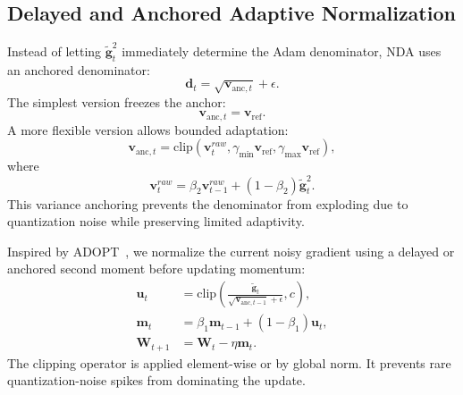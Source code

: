 \documentclass[journal]{IEEEtran}
\begin{document}
\subsection{Delayed and Anchored Adaptive Normalization}
Instead of letting $\tilde{\boldsymbol{g}}_t^2$ immediately determine the Adam denominator, NDA uses an anchored denominator:
\begin{equation}
    \boldsymbol{d}_t
    =
    \sqrt{\boldsymbol{v}_{\mathrm{anc},t}}+\epsilon.
\end{equation}
The simplest version freezes the anchor:
\begin{equation}
    \boldsymbol{v}_{\mathrm{anc},t}
    =
    \boldsymbol{v}_{\mathrm{ref}}.
\end{equation}
A more flexible version allows bounded adaptation:
\begin{equation}
    \boldsymbol{v}_{\mathrm{anc},t}
    =
    \mathrm{clip}
    (
    \boldsymbol{v}_{t}^{raw},
    \gamma_{\min}\boldsymbol{v}_{\mathrm{ref}},
    \gamma_{\max}\boldsymbol{v}_{\mathrm{ref}}
    ),
\end{equation}
where
\begin{equation}
    \boldsymbol{v}_{t}^{raw}
    =
    \beta_2\boldsymbol{v}_{t-1}^{raw}
    +
    (1-\beta_2)\tilde{\boldsymbol{g}}_t^2.
\end{equation}
This variance anchoring prevents the denominator from exploding due to quantization noise while preserving limited adaptivity.

Inspired by ADOPT~\cite{taniguchi2024adopt}, we normalize the current noisy gradient using a delayed or anchored second moment before updating momentum:
\begin{align}
    \boldsymbol{u}_t
    &=
    \mathrm{clip}
    \left(
    \frac{\tilde{\boldsymbol{g}}_t}
    {\sqrt{\boldsymbol{v}_{\mathrm{anc},t-1}}+\epsilon},
    c
    \right),\\
    \boldsymbol{m}_t
    &=
    \beta_1\boldsymbol{m}_{t-1}
    +
    (1-\beta_1)\boldsymbol{u}_t,\\
    \boldsymbol{W}_{t+1}
    &=
    \boldsymbol{W}_{t}
    -
    \eta
    \boldsymbol{m}_t.
\end{align}
The clipping operator is applied element-wise or by global norm. It prevents rare quantization-noise spikes from dominating the update.
\end{document}
